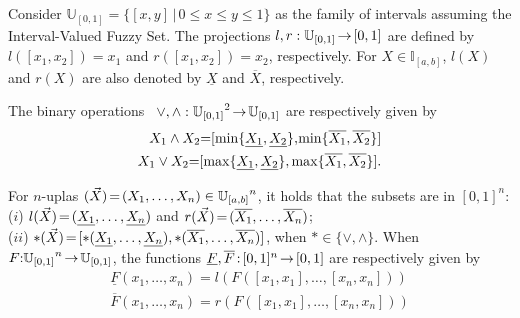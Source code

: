 \documentclass[12pt]{article}
\theoremstyle{plain}
\theoremstyle{remark}
\theoremstyle{definition}
\theoremstyle{proposition}
\newcommand{\lra}{\hspace{-0.05cm}\rightarrow\hspace{-0.05cm}}
\newcommand{\UU}{\mathbb{U} }
\begin{document}
Consider $\UU_{[0,1]} = \{[x,y] \, | \, 0\leq x\leq y\leq 1\}$ as the family of intervals assuming the Interval-Valued Fuzzy Set. The projections $l,r:\UU_{[0,1]}\hspace{-0.05cm}\rightarrow\hspace{-0.05cm} [0,1]$ are defined by $l([x_1,x_2])=x_1$ and $r([x_1,x_2])=x_2$,
respectively. For $X\in \mathbb{I}_{[a,b]}$,  $l(X)$ and $r(X)$ are also denoted by $\underline{X}$ and $\overline{X}$,
respectively.  

The binary operations \mbox{ $\vee, \wedge: {\UU_{[0,1]}}^2 \hspace{-0.05cm}\rightarrow\hspace{-0.05cm} \UU_{[0,1]}$} are  respectively given by
\begin{eqnarray}
X_1 \wedge X_2 \hspace{-0.1cm}=\hspace{-0.1cm} [\min\{\underline{X_1},\underline{X_2}\},\hspace{-0.05cm} \min\{\overline{X_1},\overline{X_2}\}] \\
X_1\vee X_2 \hspace{-0.1cm}=\hspace{-0.1cm} [\max\{\underline{X_1},\underline{X_2}\}, \max\{\overline{X_1},\overline{X_2}\}].
\end{eqnarray}

For $n$-uplas $(\vec{X})\hspace{-0.05cm}=\hspace{-0.05cm}(X_1, \ldots, X_n) \in {\UU_{[a,b]}}^n$, it holds that the subsets are in $[0,1]^n$: \\($i$) $l(\vec{X})\hspace{-0.05cm}=\hspace{-0.05cm}(\underline{X_1}, \ldots, \underline{X_n})$ and $r(\vec{X})\hspace{-0.05cm}=\hspace{-0.05cm}(\overline{X_1}, \ldots, \overline{X_n})$; \\($ii$) $\ast(\vec{X})\hspace{-0.05cm}=\hspace{-0.05cm}[\ast(\underline{X_1}, \ldots, \underline{X_n}), \ast(\overline{X_1}, \ldots, \overline{X_n})]$, when $\ast \in \{\vee, \wedge\}$.
When $F\hspace{-0.1cm}:\hspace{-0.1cm}{\UU_{[0,1]}}^n\lra \UU_{[0,1]}$, the functions $\underline{F},\overline{F}\hspace{-0.05cm}:\hspace{-0.05cm}[0,1]^n\lra [0,1]$ are respectively given by \begin{eqnarray}
\underline{F}(x_1,\ldots,x_n) =l(F([x_1,x_1],\ldots,[x_n,x_n]))\\
\overline{F}(x_1,\ldots,x_n)=r(F([x_1,x_1],\ldots,[x_n,x_n]))
\end{eqnarray}
\end{document}
